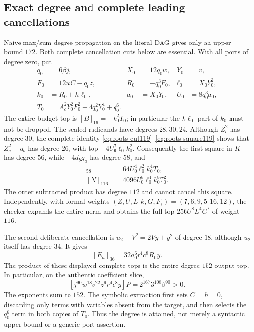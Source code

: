 \subsection{Exact degree and complete leading cancellations}
Naive max/sum degree propagation on the literal DAG gives only an upper bound
$172$. Both complete cancellation cuts below are essential.
With all ports of degree zero, put
\begin{align*}
 q_0&=6\beta j,&X_0&=12q_0w,&Y_0&=v,\\
 F_0&=12wC-q_0z,&R_0&=-q_0^3F_0,&\ell_0&=X_0Y_0^2,\\
 k_0&=R_0+h\ell_0,&a_0&=X_0Y_0,&U_0&=8q_0^3a_0,\\
 T_0&=A_c^2Y_0^2F_0^2+4q_0^2Y_0^4+q_0^6.
\end{align*}
The entire budget top is $[B]_{16}=-k_0^2T_0$; in particular the
$h\ell_0$ part of $k_0$ must not be dropped. The scaled radicands have degrees
$28,30,24$. Although $Z_c^2$ has degree $30$, the complete identity
\eqref{eq:roots-cut119}--\eqref{eq:roots-square119} shows that $Z_c^2-d_b$
has degree $26$, with top $-4U_0^2\ell_0k_0^2$. Consequently the first square
in $K$ has degree $56$, while $-4d_bg_a$ has degree $58$, and
\begin{align*}
 [K]_{58}&=64U_0^4\ell_0^2k_0^4T_0,\\
 [N]_{116}&=4096U_0^8\ell_0^4k_0^8T_0^2.
\end{align*}
The outer subtracted product has degree $112$ and cannot cancel this square.
Independently, with formal weights
$(Z,U,L,k,G,F_s)=(7,6,9,5,16,12)$, the checker expands the entire norm
and obtains the full top $256U^8L^4G^2$ of weight $116$.

The second deliberate cancellation is $u_2-V^2=2Vy+y^2$ of degree $18$,
although $u_2$ itself has degree $34$. It gives
\[
 [E_a]_{36}=32a_0^6r^4c^8R_0y.
\]
The product of these displayed complete tops is the entire degree-$152$
output top. In particular, on the authentic coefficient slice,
\[
 [j^{90}w^{18}v^{22}z^9r^4c^8y]P
      =2^{167}3^{108}\beta^{90}>0.
\]
The exponents sum to $152$. The symbolic extraction first sets $C=h=0$,
discarding only terms with variables absent from the target, and then selects
the $q_0^6$ term in both copies of $T_0$. Thus the degree is attained,
not merely a syntactic upper bound or a generic-port assertion.

